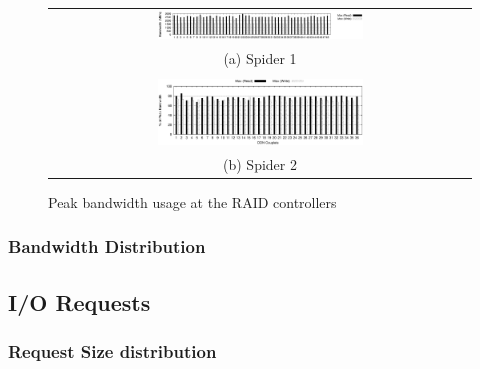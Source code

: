 \begin{figure}[!thb]
\begin{center}
\begin{tabular}{c}
{\includegraphics[width=0.50\textwidth]{./figs/spider1-bw-perc-max.eps}}\\
{(a) Spider 1}\\
\\
{\includegraphics[width=0.50\textwidth]{./figs/spider2-bw-perc-max.eps}}\\
{(b) Spider 2}\\
\end{tabular}
\vspace{-0.1in}
\caption{Peak bandwidth usage at the RAID controllers}
\label{fig:ddnpeakBW}
\end{center}
\end{figure}

\subsubsection{Bandwidth Distribution}



\subsection{I/O Requests}
\subsubsection{Request Size distribution}



